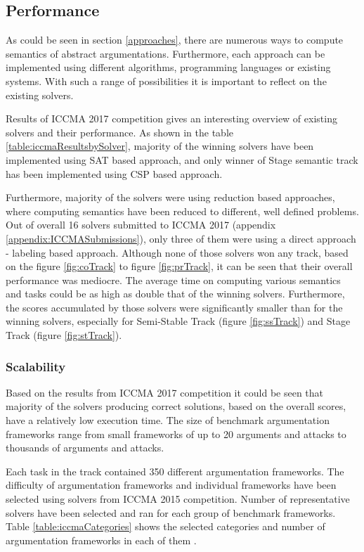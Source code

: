 \subsection{Performance}
As could be seen in section \ref{approaches}, there are numerous ways to compute semantics of abstract argumentations. Furthermore, each approach can be implemented using different algorithms, programming languages or existing systems. With such a range of possibilities it is important to reflect on the existing solvers.

Results of ICCMA 2017 competition \citep{iccmaResults} gives an interesting overview of existing solvers and their performance. As shown in the table \ref{table:iccmaResultsbySolver}, majority of the winning solvers have been implemented using SAT based approach, and only winner of Stage semantic track has been implemented using CSP based approach. 

Furthermore, majority of the solvers were using reduction based approaches, where computing semantics have been reduced to different, well defined problems. Out of overall 16 solvers submitted to ICCMA 2017 (appendix \ref{appendix:ICCMASubmissions}), only three of them were using a direct approach - labeling based approach. Although none of those solvers won any track, based on the figure \ref{fig:coTrack} to figure \ref{fig:prTrack}, it can be seen that their overall performance was mediocre. The average time on computing various semantics and tasks could be as high as double that of the winning solvers. Furthermore, the scores accumulated by those solvers were significantly smaller than for the winning solvers, especially for Semi-Stable Track (figure \ref{fig:ssTrack}) and Stage Track (figure \ref{fig:stTrack}).


\subsubsection{Scalability}
Based on the results from ICCMA 2017 competition it could be seen that majority of the solvers producing correct solutions, based on the overall scores, have a relatively low execution time. The size of benchmark argumentation frameworks range from small frameworks of up to 20 arguments and attacks to thousands of arguments and attacks.

Each task in the track contained 350 different argumentation frameworks. The difficulty of argumentation frameworks and individual frameworks have been selected using solvers from ICCMA 2015 competition. Number of representative solvers have been selected and ran for each group of benchmark frameworks. Table \ref{table:iccmaCategories} shows the selected categories and number of argumentation frameworks in each of them \citep{results_sildes}.

